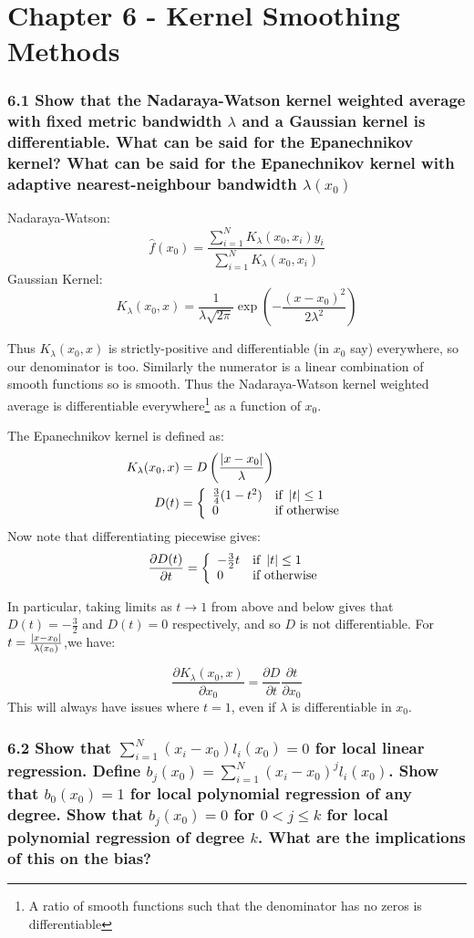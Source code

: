 
\chapter{Chapter 6 - Kernel Smoothing Methods}


\subsection*{6.1 Show that the Nadaraya-Watson kernel weighted average with fixed metric bandwidth $\lambda$ and a Gaussian kernel is differentiable. What can be said for the Epanechnikov kernel? What can be said for the Epanechnikov kernel with adaptive nearest-neighbour bandwidth $\lambda(x_0)$}

Nadaraya-Watson:
$$ \hat{f}(x_0) = \frac{\sum_{i=1}^N K_\lambda(x_0,x_i)y_i}{\sum_{i=1}^N K_\lambda(x_0,x_i)}$$
Gaussian Kernel:
$$ K_\lambda(x_0, x) = \frac{1}{\lambda \sqrt{2\pi}} \exp\left(-\frac{(x - x_0)^2}{2\lambda^2}\right) $$

Thus $K_\lambda(x_0, x)$ is strictly-positive and differentiable (in $x_0$ say) everywhere, so our denominator is too. Similarly the numerator is a linear combination of smooth functions so is smooth.
Thus the Nadaraya-Watson kernel weighted average is differentiable everywhere\footnote{A ratio of smooth functions such that the denominator has no zeros is differentiable} as a function of $x_0$.

The Epanechnikov kernel is defined as:
\begin{align*}
    K_\lambda(x_0, x) &= D\left(\frac{\left\vert x - x_0\right\vert}{\lambda}\right) \\
    D(t) &= \left\{ \begin{array}{ll} \frac{3}{4}(1-t^2) & \mbox{if }  \left\vert t\right\vert \leq 1 \\ 0 & \mbox{if } \text{otherwise} \end{array} \right.
\end{align*}
Now note that differentiating piecewise gives:
$$ \frac{\partial D(t)}{\partial t} = \left\{ \begin{array}{ll} -\frac{3}{2}t & \mbox{if }  \left\vert t\right\vert \leq 1 \\ 0 & \mbox{if } \text{otherwise} \end{array} \right. $$

In particular, taking limits as $t \rightarrow 1$ from above and below gives that $D(t) = -\frac{3}{2}$ and $D(t) = 0$ respectively, and so $D$ is not differentiable. 
For $t = \frac{\left\vert x - x_0\right\vert}{\lambda(x_0)}$,we have:

$$\frac{\partial K_\lambda(x_0, x)}{\partial x_0} = \frac{\partial D}{\partial t} \frac{\partial t}{\partial x_0} $$
This will always have issues where $t = 1$, even if $\lambda$ is differentiable in $x_0$.

\subsection*{6.2 Show that $\sum_{i=1}^N (x_i - x_0) l_i(x_0) = 0$ for local linear regression.
Define $b_j(x_0) =  \sum_{i=1}^N (x_i - x_0)^j l_i(x_0)$. Show that $b_0(x_0) = 1$ for local polynomial regression of any degree. Show that $b_j(x_0) = 0$ for $0 < j \leq k$ for local polynomial regression of degree $k$. What are the implications of this on the bias?}

